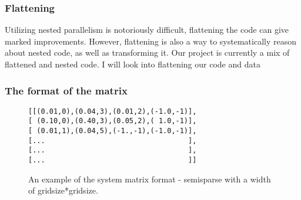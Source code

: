 \documentclass{beamer}
\begin{document}
\begin{frame}
  \frametitle{Flattening}
  Utilizing nested parallelism is notoriously difficult, flattening the code can give marked improvements. However, flattening is also a way to systematically reason about nested code, as well as transforming it. Our project is currently a mix of flattened and nested code.\newline
  \newline
  I will look into flattening our code and data
\end{frame}

\begin{frame}[fragile]
\frametitle{The format of the matrix}
\begin{figure}[!h]
\begin{lstlisting}[frame=single]
[[(0.01,0),(0.04,3),(0.01,2),(-1.0,-1)],
[ (0.10,0),(0.40,3),(0.05,2),( 1.0,-1)],
[ (0.01,1),(0.04,5),(-1.,-1),(-1.0,-1)],
[...                                  ],
[...                                  ],
[...                                  ]]
\end{lstlisting}
  \caption{An example of the system matrix format - semisparse with a width of gridsize*gridsize.}
\end{figure}
\end{frame}

%
\end{document}
